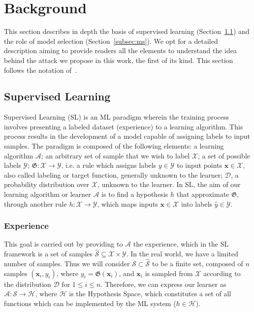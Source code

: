 \section{Background}
\label{sec:background}

This section describes in depth the basis of supervised learning (Section~\ref{subsec:sl}) and the role of model selection (Section~\ref{subsec:ms}).
We opt for a detailed description aiming to provide readers all the elements to understand the idea behind the attack we propose in this work, the first of its kind. 
This section follows the notation of~\cite{shalev2014understanding, goodfellow2016deep, oneto2020model}.

\subsection{Supervised Learning}
\label{subsec:sl}
Supervised Learning (SL) is an ML paradigm wherein the training process involves presenting a labeled dataset (experience) to a learning algorithm.
This process results in the development of a model capable of assigning labels to input samples.
The paradigm is composed of the following elements: a learning algorithm $\mathscr{A}$; an arbitrary set of sample that we wish to label $\mathcal{X}$; a set of possible labels $\mathcal{Y}$; $\mathfrak{G}: \mathcal{X} \to \mathcal{Y}$, i.e. a rule which assigns labels $y \in \mathcal{Y}$ to input points $\bm{x} \in \mathcal{X}$, also called labeling or target function, generally unknown to the learner; $\mathcal{D}$, a probability distribution over $\mathcal{X}$, unknown to the learner.
In SL, the aim of our learning algorithm or learner $\mathscr{A}$ is to find a hypothesis $h$ that approximate $\mathfrak{G}$, through another rule $h: \mathcal{X} \to \mathcal{Y}$, which maps inputs $\bm{x} \in \mathcal{X}$ into labels $\hat{y} \in \mathcal{Y}$.
\subsubsection{Experience}
This goal is carried out by providing to $\mathscr{A}$ the experience, which in the SL framework is a set of samples $\mathcal{\hat{S}} \subseteq \mathcal{X} \times \mathcal{Y}$.
In the real world, we have a limited number of samples.
Thus we will consider $\mathcal{S} \subset \mathcal{\hat{S}}$ to be a finite set, composed of $n$ samples $(\bm{x}_i, y_i)$, where $y_i = \mathfrak{G}(\bm{x}_i)$, and $\bm{x}_i$ is sampled from $\mathcal{X}$ according to the distribution $\mathcal{D}$ for $1 \leq i \leq n$.
Therefore, we can express our learner as $\mathscr{A}: \mathcal{S} \to \mathcal{H}$, where $\mathcal{H}$ is the Hypothesis Space, which constitutes a set of all functions which can be implemented by the ML system ($h \in \mathcal{H}$).
